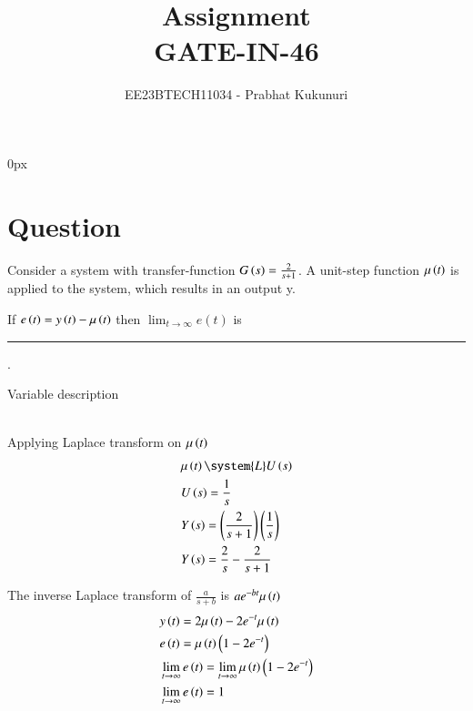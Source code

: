 \documentclass[journal,12pt,twocolumn]{IEEEtran}
\theoremstyle{remark}
\begin{document}
\parindent 0px


\vspace{3cm}

\title{Assignment\\[1ex]GATE-IN-46}
\author{EE23BTECH11034 - Prabhat Kukunuri$^{}$%
}
\maketitle
\newpage
\bigskip

\renewcommand{\thefigure}{\theenumi}
\renewcommand{\thetable}{\theenumi}
\section{Question}
Consider a system with transfer-function $G\left(s\right)=\frac{2}{s+1}$. A unit-step function $\mu\left(t\right)$ is applied to the system, which results in an output y. 

If $e\left(t\right)=y\left(t\right)-\mu\left(t\right)$ then $ \lim_{t\to\infty} e(t)$ is\rule{1.5cm}{0.15mm}.

\solution
\begin{table}[h]
    \centering
    
    \caption{Variable description}
    \label{tab:GATE.2022.EC.53.1}
\end{table}\\
Applying Laplace transform on $\mu\left(t\right)$
\begin{align}
    &\mu\brak{t}\system{L}U\brak{s}\\
    &U\brak{s}=\frac{1}{s}\\
    &Y\brak{s}=\brak{\frac{2}{s+1}}\brak{\frac{1}{s}}\\
    &Y\brak{s}=\frac{2}{s}-\frac{2}{s+1}
\end{align}



The inverse Laplace transform of $\frac{a}{s+b}$ is $ae^{-bt}\mu\left(t\right)$
\begin{align}
    &y\left(t\right)=2\mu\left(t\right)-2e^{-t}\mu\left(t\right)\\
    &e\left(t\right)=\mu\left(t\right)\left(1-2e^{-t}\right)\\
    &\lim_{t\to\infty}e\left(t\right)=\lim_{t\to\infty}\mu\left(t\right)\left(1-2e^{-t}\right)\\
    &\lim_{t\to\infty}e\left(t\right)=1
\end{align}
\end{document}
